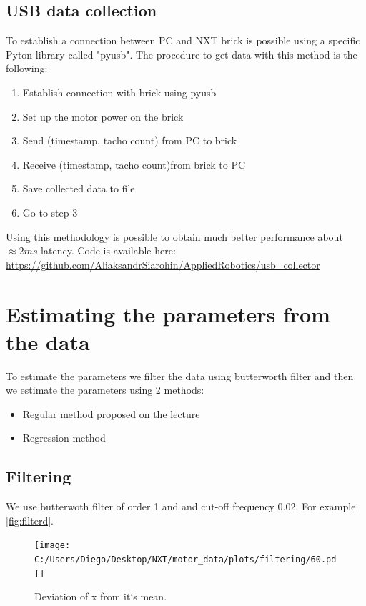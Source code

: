\documentclass[a4paper,12pt,oneside]{article}
\begin{document}
\subsection{USB data collection}
To establish a connection between PC and NXT brick is possible using a specific Pyton library called "pyusb".
The procedure to get data with this method is the following:
\begin{enumerate}
\item Establish connection with brick using pyusb
\item Set up the motor power on the brick
\item Send (timestamp,  tacho count) from PC to brick
\item Receive (timestamp,  tacho count)from brick to PC
\item Save collected data to file
\item Go to step 3
\end{enumerate}
Using this methodology is possible to obtain much better performance about $\approx 2ms$ latency. 
Code is available here: \url{https://github.com/AliaksandrSiarohin/AppliedRobotics/usb_collector}
\section {Estimating the parameters from the data}
To estimate the parameters we filter the data using butterworth filter and then we estimate the parameters using 2 methods:
\begin{itemize}
\item Regular method proposed on the lecture
\item Regression method
\end{itemize}

\subsection {Filtering}
We use butterwoth filter of order 1 and and cut-off frequency 0.02. For example \cref{fig:filterd}.
\begin{figure}[t]%
	\centering
	\texttt{[image: C:/Users/Diego/Desktop/NXT/motor\_data/plots/filtering/60.pdf]}
	\caption{Deviation of x from it`s mean.}%
	\label{fig:filtered}%
\end{figure}
\end{document}
